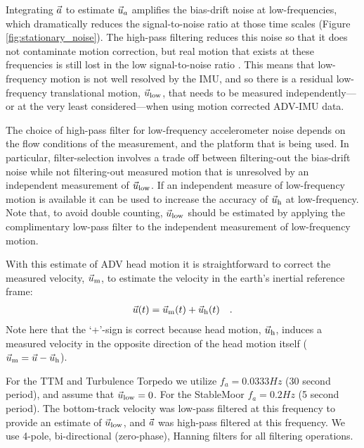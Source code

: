 Integrating ${\vec{a}}$ to estimate $\vec{u}_a$ amplifies the bias-drift noise at low-frequencies, which dramatically reduces the signal-to-noise ratio at those time scales (Figure \ref{fig:stationary_noise}).  The high-pass filtering reduces this noise so that it does not contaminate motion correction, but real motion that exists at these frequencies is still lost in the low signal-to-noise ratio \cite[]{EgelandPhD2014}. This means that low-frequency motion is not well resolved by the IMU, and so there is a residual low-frequency translational motion, $\vec{u}_\mathrm{low}$, that needs to be measured independently---or at the very least considered---when using motion corrected ADV-IMU data.

The choice of high-pass filter for low-frequency accelerometer noise depends on the flow conditions of the measurement, and the platform that is being used. In particular, filter-selection involves a trade off between filtering-out the bias-drift noise while not filtering-out measured motion that is unresolved by an independent measurement of $\vec{u}_\mathrm{low}$. If an independent measure of low-frequency motion is available it can be used to increase the accuracy of $\vec{u}_\mathrm{h}$ at low-frequency. Note that, to avoid double counting, $\vec{u}_\mathrm{low}$ should be estimated by applying the complimentary low-pass filter to the independent measurement of low-frequency motion.

With this estimate of ADV head motion it is straightforward to correct the measured velocity, $\vec{u}_\mathrm{m}$, to estimate the velocity in the earth's inertial reference frame:
\begin{align}
  \label{eqn:u_mot_def}
  \vec{u}(t) & = \vec{u}_\mathrm{m}(t) + \vec{u}_\mathrm{h}(t) &  .
\end{align}
Note here that the `+'-sign is correct because head motion, $\vec{u}_\mathrm{h}$, induces a measured velocity in the opposite direction of the head motion itself ($\vec{u}_\mathrm{m} = \vec{u} - \vec{u}_\mathrm{h}$).

For the TTM and Turbulence Torpedo we utilize $f_a = 0.0333 Hz$ (30 second period), and assume that $\vec{u}_\mathrm{low} = 0$. For the StableMoor $f_a = 0.2 Hz$ (5 second period). The bottom-track velocity was low-pass filtered at this frequency to provide an estimate of $\vec{u}_\mathrm{low}$, and ${\vec{a}}$ was high-pass filtered at this frequency. We use 4-pole, bi-directional (zero-phase), Hanning filters for all filtering operations. 



